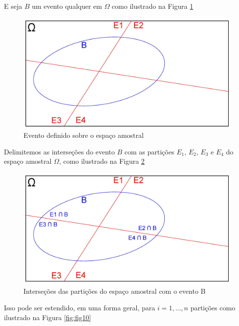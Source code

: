 \documentclass[
]{book}
\begin{document}
\hfill\break

E seja \(B\) um evento qualquer em \(\Omega\) como ilustrado na Figura \ref{fig:fig8}

\hfill\break

\begin{figure}

{\centering \includegraphics[width=0.8\linewidth]{images4/bayes_3} 

}

\caption{Evento definido sobre o espaço amostral}\label{fig:fig8}
\end{figure}

\hfill\break

Delimitemos as interseções do evento \(B\) com as partições \(E_{1}\), \(E_{2}\), \(E_{3}\) e \(E_{4}\) do espaço amostral \(\Omega\), como ilustrado na Figura \ref{fig:fig9}

\hfill\break

\begin{figure}

{\centering \includegraphics[width=0.8\linewidth]{images4/bayes_4} 

}

\caption{Interseções das partições do espaço amostral com o evento B}\label{fig:fig9}
\end{figure}

\hfill\break

Isso pode ser estendido, em uma forma geral, para \(i=1, \dots, n\) partições como ilustrado na Figura \ref{fig:fig10}
\end{document}
